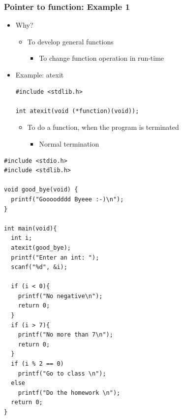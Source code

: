 \documentclass{../c-lecture}
\begin{document}
\begin{frame}[fragile]
  \frametitle{Pointer to function: Example 1}
  \begin{itemize}
    \item Why?
    \begin{itemize}
      \item To develop general functions
      \begin{itemize}
        \item To change function operation in run-time
      \end{itemize}
    \end{itemize}
    \item Example: atexit
    \begin{verbatim}
#include <stdlib.h>

int atexit(void (*function)(void));
    \end{verbatim}
    \begin{itemize}
      \item To do a function, when the program is terminated
      \begin{itemize}
        \item Normal termination
      \end{itemize}
    \end{itemize}
  \end{itemize}
\end{frame}

\begin{frame}[fragile]
  \tiny
  \begin{verbatim}
#include <stdio.h>
#include <stdlib.h>

void good_bye(void) {
  printf("Goooodddd Byeee :-)\n");
}

int main(void){
  int i;
  atexit(good_bye);
  printf("Enter an int: ");
  scanf("%d", &i);

  if (i < 0){
    printf("No negative\n");
    return 0;
  }
  if (i > 7){
    printf("No more than 7\n");
    return 0;
  }
  if (i % 2 == 0)
    printf("Go to class \n");
  else
    printf("Do the homework \n");
  return 0;
}
  \end{verbatim}
\end{frame}
\end{document}
